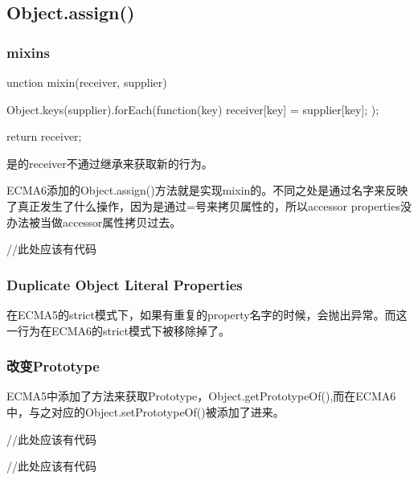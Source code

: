 \subsection{Object.assign()}

\subsubsection{mixins} 

\begin{JavaScript}
unction mixin(receiver, supplier) {
    Object.keys(supplier).forEach(function(key) {
        receiver[key] = supplier[key];
    });

    return receiver;
}
\end{JavaScript}

是的receiver不通过继承来获取新的行为。


ECMA6添加的Object.assign()方法就是实现mixin的。不同之处是通过名字来反映了真正发生了什么操作，因为是通过=号来拷贝属性的，所以accessor properties没办法被当做accessor属性拷贝过去。

\begin{JavaScript}
//此处应该有代码
\end{JavaScript}

\subsubsection{Duplicate Object Literal Properties}
在ECMA5的strict模式下，如果有重复的property名字的时候，会抛出异常。而这一行为在ECMA6的strict模式下被移除掉了。

\subsubsection{改变Prototype}
ECMA5中添加了方法来获取Prototype，Object.getPrototypeOf(),而在ECMA6中，与之对应的Object.setPrototypeOf()被添加了进来。
\begin{JavaScript}
//此处应该有代码
\end{JavaScript}


\begin{JavaScript}
//此处应该有代码
\end{JavaScript}

